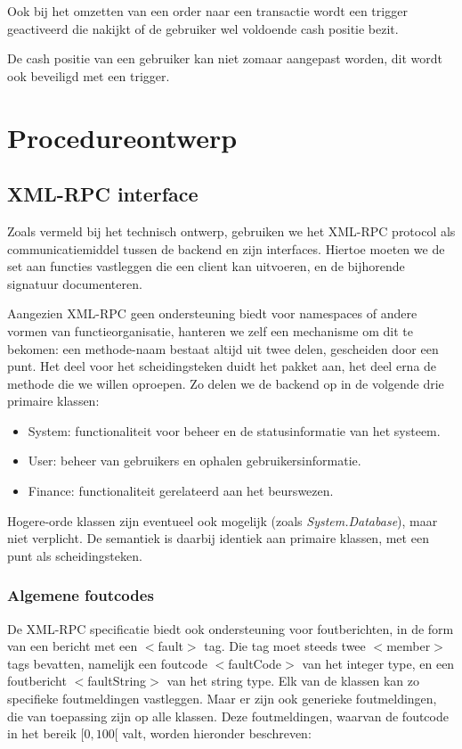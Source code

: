 Ook bij het omzetten van een order naar een transactie wordt een trigger geactiveerd die nakijkt of de gebruiker wel voldoende cash positie bezit.

De cash positie van een gebruiker kan niet zomaar aangepast worden, dit wordt ook beveiligd met een trigger.


%
%

\chapter{Procedureontwerp}

\section{XML-RPC interface}

Zoals vermeld bij het technisch ontwerp, gebruiken we het XML-RPC protocol als communicatiemiddel tussen de backend en zijn interfaces. Hiertoe moeten we de set aan functies vastleggen die een client kan uitvoeren, en de bijhorende signatuur documenteren.

Aangezien XML-RPC geen ondersteuning biedt voor namespaces of andere vormen van functieorganisatie, hanteren we zelf een mechanisme om dit te bekomen: een methode-naam bestaat altijd uit twee delen, gescheiden door een punt. Het deel voor het scheidingsteken duidt het pakket aan, het deel erna de methode die we willen oproepen.
Zo delen we de backend op in de volgende drie primaire klassen:
\begin{itemize}
\item{System: functionaliteit voor beheer en de statusinformatie van het systeem.}
\item{User: beheer van gebruikers en ophalen gebruikersinformatie.}
\item{Finance: functionaliteit gerelateerd aan het beurswezen.}
\end{itemize}
Hogere-orde klassen zijn eventueel ook mogelijk (zoals \emph{System.Database}), maar niet verplicht. De semantiek is daarbij identiek aan primaire klassen, met een punt als scheidingsteken.

\subsection{Algemene foutcodes}

De XML-RPC specificatie biedt ook ondersteuning voor foutberichten, in de form van een bericht met een $<$fault$>$ tag. Die tag moet steeds twee $<$member$>$ tags bevatten, namelijk een foutcode $<$faultCode$>$ van het integer type, en een foutbericht $<$faultString$>$ van het string type. Elk van de klassen kan zo specifieke foutmeldingen vastleggen.
Maar er zijn ook generieke foutmeldingen, die van toepassing zijn op alle klassen. Deze foutmeldingen, waarvan de foutcode in het bereik $[0, 100[$ valt, worden hieronder beschreven:

